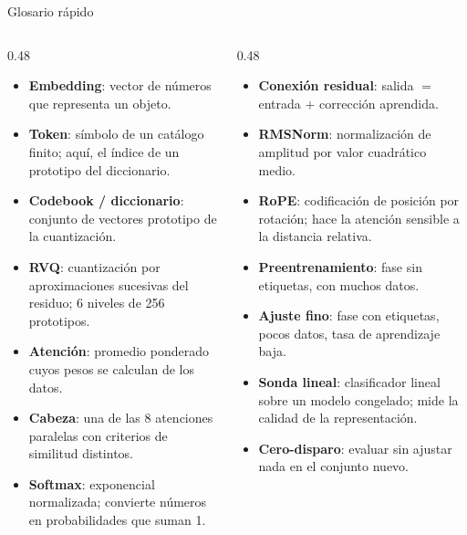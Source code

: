 \documentclass[aspectratio=169,10pt]{beamer}
\newcommand{\term}[1]{\textbf{\color{deepgreen}#1}}
\begin{document}
\begin{frame}[c]{Glosario rápido}
  \scriptsize
  \begin{columns}[T,totalwidth=\linewidth]
    \begin{column}{0.48\linewidth}
      \begin{itemize}\setlength{\itemsep}{1.2mm}
        \item \term{Embedding}: vector de números que representa un objeto.
        \item \term{Token}: símbolo de un catálogo finito; aquí, el índice de un prototipo del diccionario.
        \item \term{Codebook / diccionario}: conjunto de vectores prototipo de la cuantización.
        \item \term{RVQ}: cuantización por aproximaciones sucesivas del residuo; 6 niveles de 256 prototipos.
        \item \term{Atención}: promedio ponderado cuyos pesos se calculan de los datos.
        \item \term{Cabeza}: una de las 8 atenciones paralelas con criterios de similitud distintos.
        \item \term{Softmax}: exponencial normalizada; convierte números en probabilidades que suman 1.
      \end{itemize}
    \end{column}
    \begin{column}{0.48\linewidth}
      \begin{itemize}\setlength{\itemsep}{1.2mm}
        \item \term{Conexión residual}: salida $=$ entrada $+$ corrección aprendida.
        \item \term{RMSNorm}: normalización de amplitud por valor cuadrático medio.
        \item \term{RoPE}: codificación de posición por rotación; hace la atención sensible a la distancia relativa.
        \item \term{Preentrenamiento}: fase sin etiquetas, con muchos datos.
        \item \term{Ajuste fino}: fase con etiquetas, pocos datos, tasa de aprendizaje baja.
        \item \term{Sonda lineal}: clasificador lineal sobre un modelo congelado; mide la calidad de la representación.
        \item \term{Cero-disparo}: evaluar sin ajustar nada en el conjunto nuevo.
      \end{itemize}
    \end{column}
  \end{columns}
\end{frame}
\end{document}
